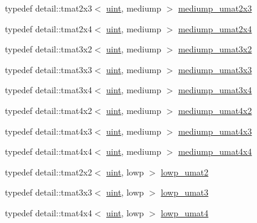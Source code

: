 \begin{CompactItemize}
\item 
typedef detail::tmat2x3$<$ \hyperlink{group__core__precision_g4fd29415871152bfb5abd588334147c8}{uint}, mediump $>$ \hyperlink{group__gtc__matrix__integer_gaae45c5dbaad1ecd57bfa936d851be1b}{mediump\_\-umat2x3}
\item 
typedef detail::tmat2x4$<$ \hyperlink{group__core__precision_g4fd29415871152bfb5abd588334147c8}{uint}, mediump $>$ \hyperlink{group__gtc__matrix__integer_gf79e9c80f024d31f3d66ddae75e90b6c}{mediump\_\-umat2x4}
\item 
typedef detail::tmat3x2$<$ \hyperlink{group__core__precision_g4fd29415871152bfb5abd588334147c8}{uint}, mediump $>$ \hyperlink{group__gtc__matrix__integer_g65a9fdb1a5918fe6f308577065983e23}{mediump\_\-umat3x2}
\item 
typedef detail::tmat3x3$<$ \hyperlink{group__core__precision_g4fd29415871152bfb5abd588334147c8}{uint}, mediump $>$ \hyperlink{group__gtc__matrix__integer_g31a05e7b2a6a596bdc7ceeb5d9c10e1c}{mediump\_\-umat3x3}
\item 
typedef detail::tmat3x4$<$ \hyperlink{group__core__precision_g4fd29415871152bfb5abd588334147c8}{uint}, mediump $>$ \hyperlink{group__gtc__matrix__integer_g8113e067e1f327fac64cf9015c8c5431}{mediump\_\-umat3x4}
\item 
typedef detail::tmat4x2$<$ \hyperlink{group__core__precision_g4fd29415871152bfb5abd588334147c8}{uint}, mediump $>$ \hyperlink{group__gtc__matrix__integer_g8ea45737e8bc9bfae2668968056b109f}{mediump\_\-umat4x2}
\item 
typedef detail::tmat4x3$<$ \hyperlink{group__core__precision_g4fd29415871152bfb5abd588334147c8}{uint}, mediump $>$ \hyperlink{group__gtc__matrix__integer_gebe3b1b4b6030c096447e40fb00528f4}{mediump\_\-umat4x3}
\item 
typedef detail::tmat4x4$<$ \hyperlink{group__core__precision_g4fd29415871152bfb5abd588334147c8}{uint}, mediump $>$ \hyperlink{group__gtc__matrix__integer_g24b1c76fefa58f810e24cafe0ea6a6a0}{mediump\_\-umat4x4}
\item 
typedef detail::tmat2x2$<$ \hyperlink{group__core__precision_g4fd29415871152bfb5abd588334147c8}{uint}, lowp $>$ \hyperlink{group__gtc__matrix__integer_g09df85e6b5e53f66a86d042e0633bfbc}{lowp\_\-umat2}
\item 
typedef detail::tmat3x3$<$ \hyperlink{group__core__precision_g4fd29415871152bfb5abd588334147c8}{uint}, lowp $>$ \hyperlink{group__gtc__matrix__integer_g7160c0ac500826224d3baf1003c0432c}{lowp\_\-umat3}
\item 
typedef detail::tmat4x4$<$ \hyperlink{group__core__precision_g4fd29415871152bfb5abd588334147c8}{uint}, lowp $>$ \hyperlink{group__gtc__matrix__integer_g571dcc0328ddd1d8c54eba047b5bfa2f}{lowp\_\-umat4}

\end{CompactItemize}
